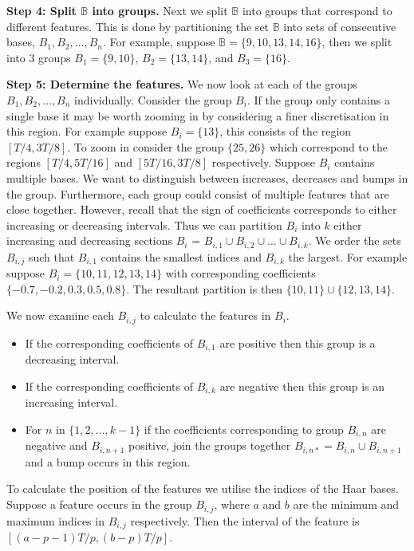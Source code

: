 \documentclass[../main.tex]{subfiles}
\begin{document}
 {\bf Step 4: Split $\mathbb{B}$ into groups.} Next we split $\mathbb{B}$ into groups that correspond to different features. This is done by partitioning the set $\mathbb{B}$ into sets of consecutive bases, $B_1, B_2, \dots, B_n$. For example, suppose $\mathbb{B} = \{9,10,13,14,16\}$, then we split into 3 groups $B_1 = \{9,10\}$, $B_2 = \{13,14\}$, and $B_3 = \{16\}$.    
 
{\bf Step 5: Determine the features.} We now look at each of the groups $B_1, B_2, \dots, B_n$ individually. Consider the group $B_i$. If the group only contains a single base it may be worth zooming in by considering a finer discretisation in this region. For example suppose $B_i = \{ 13\}$, this consists of the region $[T/4,3T/8]$. To zoom in consider the group $\{25,26\}$ which correspond to the regions $[T/4,5T/16]$ and $[5T/16,3T/8]$ respectively. 
Suppose $B_i$ contains multiple bases. We want to distinguish between increases, decreases and bumps in the group.  Furthermore, each group could consist of multiple features that are close together. However, recall that the sign of coefficients corresponds to either increasing or decreasing intervals. Thus we can partition $B_i$ into $k$ either increasing and decreasing sections $B_i$ = $B_{i,1} \cup B_{i,2} \cup \dots \cup B_{i,k}$. We order the sets $B_{i,j}$ such that $B_{i,1}$ contains the smallest indices and $B_{i,k}$ the largest. For example suppose $B_i = \{10,11,12,13,14\}$ with corresponding coefficients $\{-0.7,-0.2,0.3,0.5,0.8\}$. The resultant partition is then $\{10,11\} \cup \{12,13,14\}$. 

We now examine each $B_{i,j}$ to calculate the features in $B_i$.
\begin{itemize}
	\item If the corresponding coefficients of $B_{i,1}$ are positive then this group is a decreasing interval.
	\item If the corresponding coefficients of $B_{i,k}$ are negative then this group is an increasing interval.
	\item For $n$ in $\{1,2,\dots,k-1\}$ if the coefficients corresponding to group $B_{i,n}$ are negative and $B_{i,n+1}$ positive, join the groups together $B_{i,n*} = B_{i,n} \cup B_{i,n+1}$ and a bump occurs in this region. 
\end{itemize}
 To calculate the position of the features we utilise the indices of the Haar bases. Suppose a feature occurs in the group $B_{i,j}$, where $a$ and $b$ are the minimum and maximum indices in $B_{i,j}$ respectively. Then the interval of the feature is $\left[(a-p-1)T/p , (b-p)T/p \right]$.
 
\end{document}
